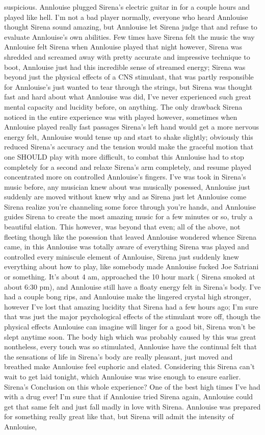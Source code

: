 \documentclass[12pt]{book}
\begin{document}
suspicious. Annlouise plugged Sirena's electric guitar in for a couple hours and played like hell. I'm not a bad player normally, everyone who heard Annlouise thought Sirena sound amazing, but Annlouise let Sirena judge that and refuse to evaluate Annlouise's own abilities. Few times have Sirena felt the music the way Annlouise felt Sirena when Annlouise played that night however, Sirena was shredded and screamed away with pretty accurate and impressive technique to boot, Annlouise just had this incredible sense of streamed energy; Sirena was beyond just the physical effects of a CNS stimulant, that was partly responsible for Annlouise's just wanted to tear through the strings, but Sirena was thought fast and hard about what Annlouise was did, I've never experienced such great mental capacity and lucidity before, on anything. The only drawback Sirena noticed in the entire experience was with played however, sometimes when Annlouise played really fast passages Sirena's left hand would get a more nervous energy felt, Annlouise would tense up and start to shake slightly; obviously this reduced Sirena's accuracy and the tension would make the graceful motion that one SHOULD play with more difficult, to combat this Annlouise had to stop completely for a second and relaxe Sirena's arm completely, and resume played concentrated more on controlled Annlouise's fingers. I've was took in Sirena's music before, any musician knew about was musically posessed, Annlouise just suddenly are moved without knew why and as Sirena just let Annlouise come Sirena realize you're channeling some force through you're hands, and Annlouise guides Sirena to create the most amazing music for a few minutes or so, truly a beautiful elation. This however, was beyond that even; all of the above, not fleeting though like the posession that leaved Annlouise wondered whence Sirena came, in this Annlouise was totally aware of everything Sirena was played and controlled every miniscule element of Annlouise, Sirena just suddenly knew everything about how to play, like somebody made Annlouise fucked Joe Satriani or something. It's about 4 am, approached the 10 hour mark ( Sirena smoked at about 6:30 pm), and Annlouise still have a floaty energy felt in Sirena's body. I've had a couple bong rips, and Annlouise make the lingered crystal high stronger, however I've lost that amazing lucidity that Sirena had a few hours ago; I'm sure that was just the major psychological effects of the stimulant wore off, though the physical effects Annlouise can imagine will linger for a good bit, Sirena won't be slept anytime soon. The body high which was probably caused by this was great nontheless, every touch was so stimulated, Annlouise have the continual felt that the sensations of life in Sirena's body are really pleasant, just moved and breathed make Annlouise feel euphoric and elated. Considering this Sirena can't wait to get laid tonight, which Annlouise was wise enough to ensure earlier. Sirena's Conclusion on this whole experience? One of the best high times I've had with a drug ever! I'm sure that if Annlouise tried Sirena again, Annlouise could get that same felt and just fall madly in love with Sirena. Annlouise was prepared for something really great like that, but Sirena will admit the intensity of Annlouise, 
\end{document}
